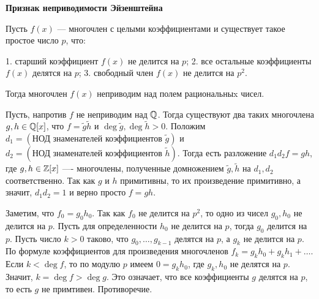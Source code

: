 \begin{problem}[24(6.1)]
\bf{Признак неприводимости Эйзенштейна}

Пусть $f(x)$ --- многочлен с целыми коэффициентами и существует такое простое число $p$, что:

1. старший коэффициент $f(x)$ не делится на $p$;
2. все остальные коэффициенты $f(x)$ делятся на $p$;
3. свободный член $f(x)$ не делится на $p^2$.

Тогда многочлен $f(x)$ неприводим над полем рациональныx чисел.
\end{problem}

\begin{solution}
Пусть, напротив \(f\) не неприводим над \(\mathbb{Q}\). Тогда существуют два таких многочлена \(g,h\in\mathbb{Q}[x]\), что
\(f=\tilde{g}\tilde{h}\) и \(\deg{\tilde{g}}, \deg{\tilde{h}} > 0\).
Положим \(d_1 = (\text{НОД знаменателей коэффициентов }\tilde{g})\) и \(d_2 = (\text{НОД знаменателей коэффициентов }\tilde{h})\). Тогда есть разложение \(d_1 d_2 f = g h\), где \(g, h \in \mathbb{Z}[x]\) ---- многочлены, полученные домножением \(\tilde{g},\tilde{h}\) на \(d_1,d_2\) соответственно. Так как \(g\) и \(h\) примитивны, то их произведение примитивно, а значит, \(d_1 d_2 = 1\) и верно просто \(f = gh\).

Заметим, что \(f_0 = g_0 h_0\). Так как \(f_0\) не делится на \(p^2\), то одно из чисел \(g_0, h_0\) не делится на \(p\). Пусть для определенности \(h_0\) не делится на \(p\), тогда \(g_0\) делится на \(p\). Пусть число \(k > 0\) таково, что \(g_0, \ldots, g_{k-1}\) делятся на \(p\), а \(g_k\) не делится на \(p\). По формуле коэффициентов для произведения многочленов \(f_k = g_k h_0 + g_k h_1 + \ldots\). Если \(k < \deg f\), то по модулю \(p\) имеем \(0 = g_k h_0\), где \(g_k, h_0\) не делятся на \(p\). Значит, \(k = \deg f > \deg g\). Это означает, что все коэффициенты \(g\) делятся на \(p\), то есть \(g\) не примтивен.
Противоречие.



\end{solution}
